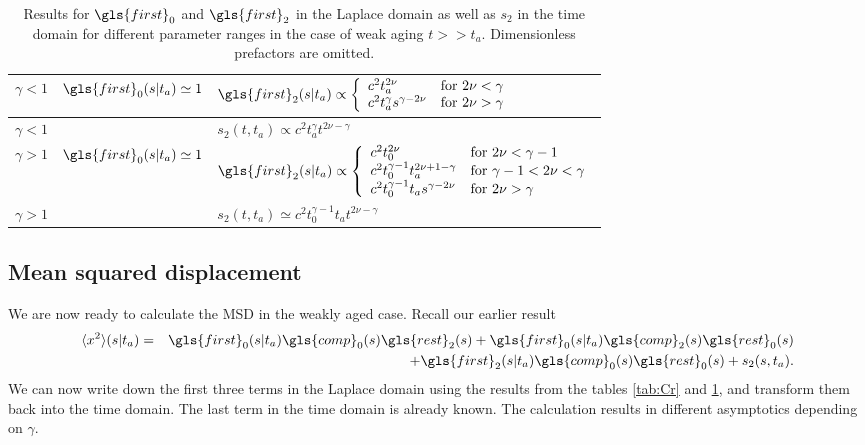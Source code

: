 \begin{center}
\begin{table}[h!]
 \begin{tabular}{||l|l|l||}
 \hline \hline
\rule[-4mm]{0cm}{1cm}   $\gamma<1$ & $\gls{first}_0(s|t_a) \simeq 1$ & $\gls{first}_2(s|t_a) \propto \left\{
\begin{array}{ll}
c^2 t_a^{2\nu}  & \mbox{for } 2\nu < \gamma \\
c^2 t_a^\gamma s^{\gamma-2\nu} & \mbox{for } 2\nu > \gamma
\end{array} \right. $\\ \hline
\rule[-4mm]{0cm}{1cm} $\gamma<1$ & $  $ & $s_2(t,t_a) \propto c^2 t_a^\gamma t^{2\nu -\gamma} $ \\ \hline
\rule[-4mm]{0cm}{1cm} $\gamma>1$ & $\gls{first}_0(s|t_a) \simeq 1$ & $\gls{first}_2(s|t_a) \propto \left\{
 \begin{array}{ll}
c^2  t_0^{2\nu} & \mbox{for } 2\nu < \gamma  -1     \\
  c^2  t_0^{\gamma-1} t_a^{2\nu +1- \gamma } & \mbox{for } \gamma-1 < 2\nu < \gamma \\
 c^2 t_0^{\gamma-1} t_a s^{\gamma - 2\nu} & \mbox{for } 2\nu > \gamma
 \end{array}
 \right. $ \\ \hline
\rule[-4mm]{0cm}{1cm} $\gamma>1$& & $s_2(t,t_a) \simeq c^2 t_0^{\gamma-1}  t_a t^{2\nu-\gamma}$ \\ \hline \hline
\end{tabular}
\caption{Results for $\gls{first}_0$ and $\gls{first}_2$ in the Laplace domain as well as $s_2$ in the time domain for different parameter ranges in the case of weak aging $t>>t_a$. Dimensionless prefactors are omitted. \label{tab:sFweakAging}}
\end{table}
\end{center}



\subsection{Mean squared displacement}

We are now ready to calculate the MSD in the weakly aged case. Recall our earlier result
\begin{eqnarray}
\langle x^2 \rangle (s|t_a) &=&  \gls{first}_0(s|t_a) \gls{comp}_0(s) \gls{rest}_2(s) + \gls{first}_0(s|t_a) \gls{comp}_2(s) \gls{rest}_0(s)  \nonumber \\
&& \;\; + \gls{first}_2(s|t_a) \gls{comp}_0(s) \gls{rest}_0(s) + s_{2}(s,t_a) .
\end{eqnarray}
We can now write down the first three terms in the Laplace domain using the results from the tables \ref{tab:Cr} and \ref{tab:sFweakAging}, and transform them back into the time domain.
The last term in the time domain is already known. The calculation results in different asymptotics depending on $\gamma$.

